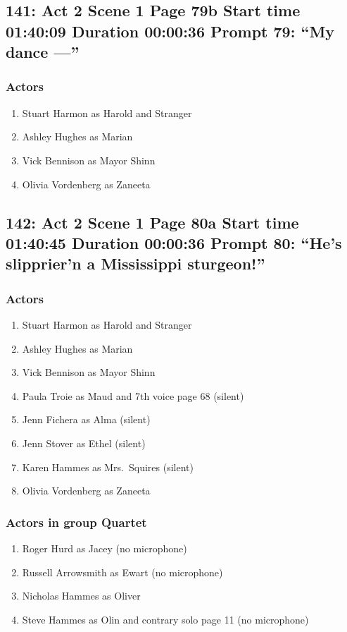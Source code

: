 \subsection{141: Act 2 Scene 1 Page 79b Start time 01:40:09 Duration 00:00:36 Prompt 79: ``My dance ---''}

\subsubsection{Actors}
\begin{enumerate}
\item Stuart Harmon as Harold and Stranger
\item Ashley Hughes as Marian
\item Vick Bennison as Mayor Shinn
\item Olivia Vordenberg as Zaneeta
\end{enumerate}


\subsection{142: Act 2 Scene 1 Page 80a Start time 01:40:45 Duration 00:00:36 Prompt 80: ``He's slipprier'n a Mississippi sturgeon!''}

\subsubsection{Actors}
\begin{enumerate}
\item Stuart Harmon as Harold and Stranger
\item Ashley Hughes as Marian
\item Vick Bennison as Mayor Shinn
\item Paula Troie as Maud and 7th voice page 68 (silent)
\item Jenn Fichera as Alma (silent)
\item Jenn Stover as Ethel (silent)
\item Karen Hammes as Mrs.~Squires (silent)
\item Olivia Vordenberg as Zaneeta
\end{enumerate}
\subsubsection{Actors in group Quartet}
\begin{enumerate}
\item Roger Hurd as Jacey (no microphone)
\item Russell Arrowsmith as Ewart (no microphone)
\item Nicholas Hammes as Oliver
\item Steve Hammes as Olin and contrary solo page 11 (no microphone)
\end{enumerate}


